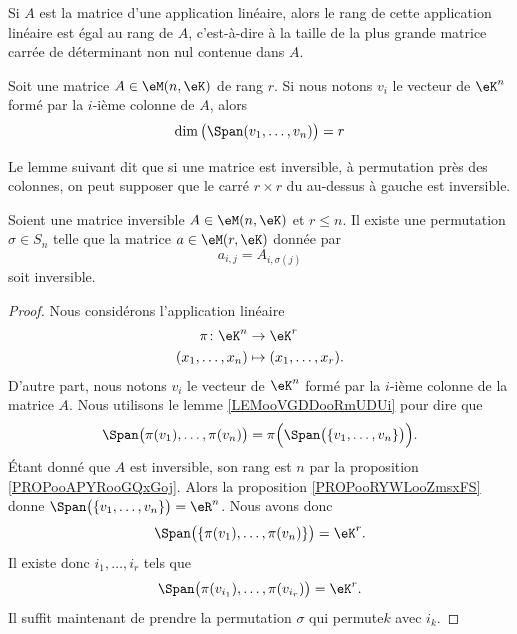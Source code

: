 \begin{proposition} \label{PropEJBZooTNFPRj}
	Si \( A\) est la matrice d'une application linéaire, alors le rang de cette application linéaire est égal au rang de \( A \), c'est-à-dire à la taille de la plus grande matrice carrée de déterminant non nul contenue dans \( A\).
\end{proposition}


\begin{proposition}	\label{PROPooRYWLooZmsxFS}
	Soit une matrice \( A\in \eM(n,\eK)\) de rang \( r\). Si nous notons \( v_i\) le vecteur de \( \eK^n\) formé par la \( i\)-ième colonne de \( A\), alors
	\begin{equation}
		\dim\big( \Span(v_1,\ldots,v_n) \big)=r
	\end{equation}
\end{proposition}


Le lemme suivant dit que si une matrice est inversible, à permutation près des colonnes, on peut supposer que le carré \( r\times r\) du au-dessus à gauche est inversible.

\begin{lemma}        \label{LEMooMCIDooYBHrbq}
	Soient une matrice inversible \( A\in \eM(n,\eK)\) et \( r\leq n\). Il existe une permutation \( \sigma\in S_n\) telle que la matrice \( a\in\eM(r,\eK)\) donnée par
	\begin{equation}
		a_{i,j}=A_{i,\sigma(j)}
	\end{equation}
	soit inversible.
\end{lemma}

\begin{proof}
	Nous considérons l'application linéaire
	\begin{equation}
		\begin{aligned}
			\pi\colon \eK^n  & \to \eK^r                 \\
			(x_1,\ldots,x_n) & \mapsto (x_1,\ldots,x_r).
		\end{aligned}
	\end{equation}
	D'autre part, nous notons \( v_i\) le vecteur de \( \eK^n\) formé par la \( i\)-ième colonne de la matrice \( A\). Nous utilisons le lemme \ref{LEMooVGDDooRmUDUi} pour dire que
	\begin{equation}
		\Span\big( \pi(v_1),\ldots,\pi(v_n) \big)=\pi\Big( \Span\big( \{ v_1,\ldots,v_n \} \big) \Big).
	\end{equation}
	Étant donné que \( A\) est inversible, son rang est \( n\) par la proposition \ref{PROPooAPYRooGQxGoj}. Alors la proposition \ref{PROPooRYWLooZmsxFS} donne \( \Span\big( \{ v_1,\ldots,v_n \} \big)=\eR^n\). Nous avons donc
	\begin{equation}
		\Span\big( \{ \pi(v_1),\ldots,\pi(v_n) \} \big)=\eK^r.
	\end{equation}
	Il existe donc \( i_1,\ldots,i_r\) tels que
	\begin{equation}
		\Span\big( \pi(v_{i_1}),\ldots,\pi(v_{i_r}) \big)=\eK^r.
	\end{equation}
	Il suffit maintenant de prendre la permutation \( \sigma\) qui permute\( k\) avec \( i_k\).
\end{proof}

